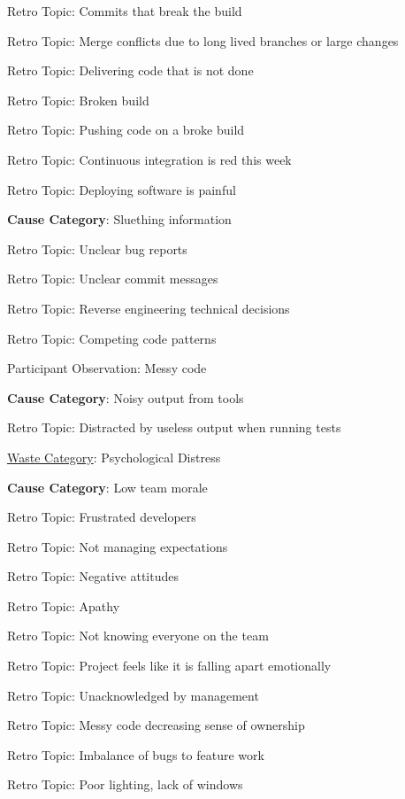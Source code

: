 \quad \quad Retro Topic: Commits that break the build

\quad \quad Retro Topic: Merge conflicts due to long lived branches or large changes

\quad \quad Retro Topic: Delivering code that is not done

\quad \quad Retro Topic: Broken build

\quad \quad Retro Topic: Pushing code on a broke build

\quad \quad Retro Topic: Continuous integration is red this week

\quad \quad Retro Topic: Deploying software is painful

\quad \textbf{Cause Category}: Sluething information

\quad \quad Retro Topic: Unclear bug reports

\quad \quad Retro Topic: Unclear commit messages

\quad \quad Retro Topic: Reverse engineering technical decisions

\quad \quad Retro Topic: Competing code patterns

\quad \quad Participant Observation: Messy code

\quad \textbf{Cause Category}: Noisy output from tools

\quad \quad Retro Topic: Distracted by useless output when running tests






\underline{Waste Category}: Psychological Distress

\quad \textbf{Cause Category}: Low team morale

\quad \quad Retro Topic: Frustrated developers

\quad \quad Retro Topic: Not managing expectations

\quad \quad Retro Topic: Negative attitudes

\quad \quad Retro Topic: Apathy

\quad \quad Retro Topic: Not knowing everyone on the team

\quad \quad Retro Topic: Project feels like it is falling apart emotionally

\quad \quad Retro Topic: Unacknowledged by management

\quad \quad Retro Topic: Messy code decreasing sense of ownership

\quad \quad Retro Topic: Imbalance of bugs to feature work

\quad \quad Retro Topic: Poor lighting, lack of windows

